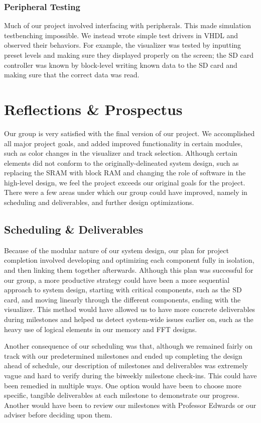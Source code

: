 \documentclass{article}
\begin{document}
\subsubsection{Peripheral Testing}

Much of our project involved interfacing with peripherals. This made simulation
testbenching impossible. We instead wrote simple test drivers in VHDL and
observed their behaviors. For example, the visualizer was tested by inputting
preset levels and making sure they displayed properly on the screen; the SD
card controller was known by block-level writing known data to the SD card and
making sure that the correct data was read.

\section{Reflections \& Prospectus}

Our group is very satisfied with the final version of our project. We accomplished all 
major project goals, and added improved functionality in certain modules, such as 
color changes in the visualizer and track selection. Although certain elements did not 
conform to the originally-delineated system design, such as replacing the SRAM with 
block RAM and changing the role of software in the high-level design, we feel the 
project exceeds our original goals for the project. There were a few areas under 
which our group could have improved, namely in scheduling and deliverables, and 
further design optimizations.

\subsection{Scheduling \& Deliverables}
Because of the modular nature of our system design, our plan for project completion 
involved developing and optimizing each component fully in isolation, and then 
linking them together afterwards. Although this plan was successful for our group, a 
more productive strategy could have been a more sequential approach to system 
design, starting with critical components, such as the SD card, and moving linearly 
through the different components, ending with the visualizer.  This method would 
have allowed us to have more concrete deliverables during milestones and helped 
us detect system-wide issues earlier on, such as the heavy use of logical elements in 
our memory and FFT designs. 

Another consequence of our scheduling was that, although we remained fairly on 
track with our predetermined milestones and ended up completing the design ahead 
of schedule, our description of milestones and deliverables was extremely vague and 
hard to verify during the biweekly milestone check-ins. This could have been 
remedied in multiple ways. One option would have been to choose more specific, 
tangible deliverables at each milestone to demonstrate our progress. Another would 
have been to review our milestones with Professor Edwards or our adviser before 
deciding upon them. 
\end{document}

